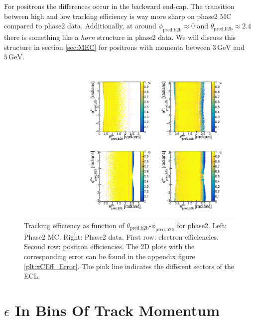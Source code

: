 \documentclass[a4paper,11pt,twosided,final,german,openbib,pdftex,listof=totoc,bibliography=totoc]{scrbook}
\begin{document}
For positrons the differences occur in the backward end-cap. The transition between high and low tracking efficiency is way more sharp on phase2 MC compared to phase2 data. Additionally, at around $\phi_{\textrm{pred,b2b}} \approx 0$ and $\theta_{\textrm{pred,b2b}} \approx 2.4$ there is something like a \textit{horn} structure in phase2 data. We will discuss this structure  in section \ref{sec:MEC} for positrons with momenta between $3\,\textrm{GeV}$ and $5\,\textrm{GeV}$.



\begin{figure}[!htbp]
	\centering
	\includegraphics[width=\textwidth]{Plots/master/xCEffTP_MCData.pdf}
	\caption[$\theta_{\textrm{pred,b2b}}$-$\phi_{\textrm{pred,b2b}}$ Efficiency Plots Phase2]{Tracking efficiency as function of $\theta_{\textrm{pred,b2b}}$-$\phi_{\textrm{pred,b2b}}$ for phase2. Left: Phase2 MC. Right: Phase2 data. First row: electron efficiencies. Second row: positron efficiencies. The 2D plots with the corresponding error can be found in the appendix figure \ref{plt:xCEff_Error}. The pink line indicates the different sectors of the ECL.}
	\label{plt:xCEff}
\end{figure}





\clearpage





\section{$\epsilon$ In Bins Of Track Momentum}
\end{document}
